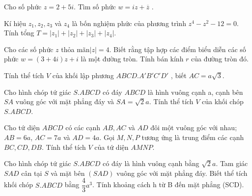 \begin{vnmultiplechoice}[ rearrange=yes, keycolumns=5]
\begin{question} %
Cho số phức  $z=2+5i$. Tìm số phức  $w=iz+\overline{z}$ .
\datcot
\bonpa
{}
{}
{}
{}
\end{question}


\begin{question} %
Kí hiệu $z_1, z_2, z_3$ và $z_4$ là bốn nghiệm phức của phương trình $z^4-z^2-12=0$.\\
Tính tổng $T=|z_1|+|z_2|+|z_3|+|z_4|$. 
\datcot
\bonpa
{}
{}
{}
{}
\end{question}


\begin{question} %
Cho các số phức $z$ thỏa mãn$ | z | = 4$. Biết rằng tập hợp các điểm biểu diễn các
số phức  $w=(3+4i)z+i$ là một đường tròn. Tính bán kính $r$ của đường tròn đó.
\datcot
\bonpa
{}
{}
{}
{}
\end{question}


\begin{question} %
Tính thể tích $V$ của khối lập phương  $ABCD. A' B' C' D'$ , biết  $AC=a\sqrt3$.
\datcot
\bonpa
{}
{}
{}
{}
\end{question}


\begin{question} %
Cho hình chóp tứ giác $S.ABCD$ có đáy $ABCD$ là hình vuông cạnh a, cạnh bên
$SA$ vuông góc với mặt phẳng đáy và  $SA=\sqrt2 a$. Tính thể tích $V$ của khối chóp $S.ABCD$.
\datcot
\bonpa
{}
{}
{}
{}
\end{question}

\begin{question} %
 Cho tứ diện $ABCD$ có các cạnh $AB, AC$ và $AD$ đôi một vuông góc với nhau; $AB = 6a$,
$AC = 7a$ và $AD = 4a$. Gọi $M, N, P$ tương ứng là trung điểm các cạnh $BC, CD, DB$. Tính thể tích
$V$ của tứ diện $AMNP$.
\datcot
\bonpa
{}
{}
{}
{}
\end{question}

\begin{question}%
Cho hình chóp tứ giác $S.ABCD$ có đáy là hình vuông cạnh bằng $\sqrt2a $. Tam
giác $SAD$ cân tại $S$ và mặt bên $(SAD)$ vuông góc với mặt phẳng đáy. Biết thể tích khối
chóp $S.ABCD$ bằng $\dfrac{4}{3}a^3$. Tính khoảng cách h từ B đến mặt phẳng (SCD).
\datcot
\bonpa
{}
{}
{}
{}
\end{question}


\end{vnmultiplechoice}
